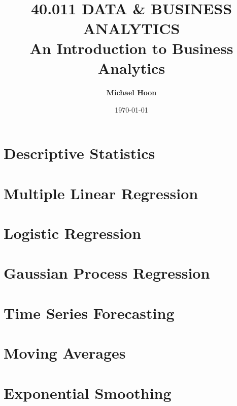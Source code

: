 \documentclass{article}
\begin{document}

\title{ \normalsize \textsc{}
		\\ [2.0cm]
		\HRule{1.5pt} \\
		\LARGE \textbf{\uppercase{40.011 Data \& Business Analytics}
		\HRule{2.0pt} \\ [0.6cm] \LARGE{An Introduction to Business Analytics} \vspace*{10\baselineskip}}
		}
\date{\today}
\author{\textbf{Michael Hoon}}

\maketitle
\newpage

\tableofcontents
\newpage


\section{Descriptive Statistics}

\section{Multiple Linear Regression}

\section{Logistic Regression}

\section{Gaussian Process Regression}

\section{Time Series Forecasting}

\section{Moving Averages}

\section{Exponential Smoothing}
\end{document}
